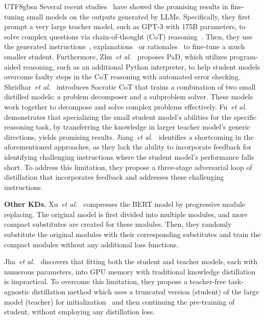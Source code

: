 \documentclass[10pt,journal,compsoc]{IEEEtran}
\newcommand{\etal}{\emph{et al.}}
\newcommand{\<}{\left\langle}
\renewcommand{\>}{\right\rangle}
\newcommand{\1}{\mathbbm{1}}
\begin{document}
\begin{CJK}{UTF8}{gbsn}
Several recent studies~\cite{ho2022large,hsieh2023distilling,magister2022teaching,wang2023scott,saha2023can,jiang2023lion,wu2023lamini,li2022explanations,west2021symbolic} have showed the promising results in fine-tuning small models on the outputs generated by LLMs. Specifically, they first prompt a very large teacher model, such as GPT-3 with 175B parameters, to solve complex questions via chain-of-thought (CoT) reasoning~\cite{wei2022chain}. Then, they use the generated instructions~\cite{jiang2023lion,wu2023lamini}, explanations~\cite{li2022explanations} or rationales~\cite{ho2022large} to fine-tune a much smaller student. Furthermore, Zhu~\etal~\cite{zhu2023pad} proposes PaD, which utilizes program-aided reasoning, such as an additional Python interpreter, to help student models overcome faulty steps in the CoT reasoning with automated error checking.
Shridhar~\etal~\cite{shridhar2023distilling} introduces Socratic CoT that trains a combination of two small distilled models: a problem decomposer and a subproblem solver. These models work together to decompose and solve complex problems effectively.
Fu~\etal~\cite{fu2023specializing} demonstrates that specializing the small student model's abilities for the specific reasoning task, by transferring the knowledge in larger teacher model's generic directions, yields promising results.
Jiang~\etal~\cite{jiang2023lion} identifies a shortcoming in the aforementioned approaches, as they lack the ability to incorporate feedback for identifying challenging instructions where the student model's performance falls short. To address this limitation, they propose a three-stage adversarial loop of distillation that incorporates feedback and addresses these challenging instructions.

\noindent\textbf{Other KDs.}
Xu~\etal~\cite{xu2020bert} compresses the BERT model by progressive module replacing. The original model is first divided into multiple modules, and more compact substitutes are created for these modules. Then, they randomly substitute the original modules with their corresponding substitutes and train the compact modules without any additional loss functions.

Jha~\etal~\cite{jha2023large} discovers that fitting both the student and teacher models, each with numerous parameters, into GPU memory with traditional knowledge distillation is impractical. To overcome this limitation, they propose a teacher-free task-agnostic distillation method which uses a truncated version (student) of the large model (teacher) for initialization~\cite{li2021short} and then continuing the pre-training of student, without employing any distillation loss.



\end{CJK}
\end{document}
